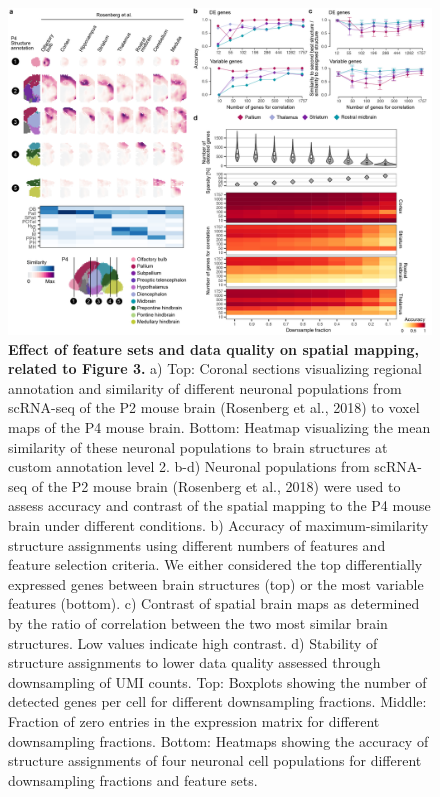 \begin{figure}[h!]
    \centering
	\includegraphics[width=\textwidth]{figures/voxhunt/Supp_2}
    \caption{\textbf{Effect of feature sets and data quality on spatial mapping, related to Figure 3.} a) Top: Coronal sections visualizing regional annotation and similarity of different neuronal populations from scRNA-seq of the P2 mouse brain (Rosenberg et al., 2018) to voxel maps of the P4 mouse brain. Bottom: Heatmap visualizing the mean similarity of these neuronal populations to brain structures at custom annotation level 2. b-d) Neuronal populations from scRNA-seq of the P2 mouse brain (Rosenberg et al., 2018) were used to assess accuracy and contrast of the spatial mapping to the P4 mouse brain under different conditions. b) Accuracy of maximum-similarity structure assignments using different numbers of features and feature selection criteria. We either considered the top differentially expressed genes between brain structures (top) or the most variable features (bottom). c) Contrast of spatial brain maps as determined by the ratio of correlation between the two most similar brain structures. Low values indicate high contrast. d) Stability of structure assignments to lower data quality assessed through downsampling of UMI counts. Top: Boxplots showing the number of detected genes per cell for different downsampling fractions. Middle: Fraction of zero entries in the expression matrix for different downsampling fractions. Bottom: Heatmaps showing the accuracy of structure assignments of four neuronal cell populations for different downsampling fractions and feature sets.}
    \label{fig:voxS2}
\end{figure}

